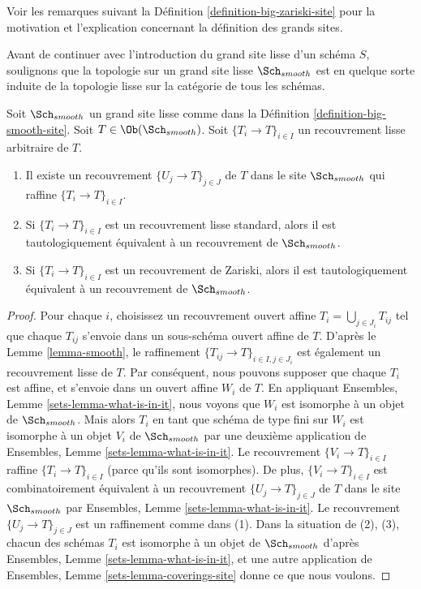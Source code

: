 \noindent
Voir les remarques suivant la Définition \ref{definition-big-zariski-site} pour la motivation et l'explication concernant la définition des grands sites.

\medskip\noindent
Avant de continuer avec l'introduction du grand site lisse d'un schéma $S$, soulignons que la topologie sur un grand site lisse $\Sch_{smooth}$ est en quelque sorte induite de la topologie lisse sur la catégorie de tous les schémas.

\begin{lemma}
\label{lemma-smooth-induced}
Soit $\Sch_{smooth}$ un grand site lisse comme dans la Définition \ref{definition-big-smooth-site}. Soit $T \in \Ob(\Sch_{smooth})$. Soit $\{T_i \to T\}_{i \in I}$ un recouvrement lisse arbitraire de $T$.
\begin{enumerate}
\item Il existe un recouvrement $\{U_j \to T\}_{j \in J}$ de $T$ dans le site $\Sch_{smooth}$ qui raffine $\{T_i \to T\}_{i \in I}$.
\item Si $\{T_i \to T\}_{i \in I}$ est un recouvrement lisse standard, alors il est tautologiquement équivalent à un recouvrement de $\Sch_{smooth}$.
\item Si $\{T_i \to T\}_{i \in I}$ est un recouvrement de Zariski, alors il est tautologiquement équivalent à un recouvrement de $\Sch_{smooth}$.
\end{enumerate}
\end{lemma}

\begin{proof}
Pour chaque $i$, choisissez un recouvrement ouvert affine $T_i = \bigcup_{j \in J_i} T_{ij}$ tel que chaque $T_{ij}$ s'envoie dans un sous-schéma ouvert affine de $T$. D'après le Lemme \ref{lemma-smooth}, le raffinement $\{T_{ij} \to T\}_{i \in I, j \in J_i}$ est également un recouvrement lisse de $T$. Par conséquent, nous pouvons supposer que chaque $T_i$ est affine, et s'envoie dans un ouvert affine $W_i$ de $T$. En appliquant Ensembles, Lemme \ref{sets-lemma-what-is-in-it}, nous voyons que $W_i$ est isomorphe à un objet de $\Sch_{smooth}$. Mais alors $T_i$ en tant que schéma de type fini sur $W_i$ est isomorphe à un objet $V_i$ de $\Sch_{smooth}$ par une deuxième application de Ensembles, Lemme \ref{sets-lemma-what-is-in-it}. Le recouvrement $\{V_i \to T\}_{i \in I}$ raffine $\{T_i \to T\}_{i \in I}$ (parce qu'ils sont isomorphes). De plus, $\{V_i \to T\}_{i \in I}$ est combinatoirement équivalent à un recouvrement $\{U_j \to T\}_{j \in J}$ de $T$ dans le site $\Sch_{smooth}$ par Ensembles, Lemme \ref{sets-lemma-what-is-in-it}. Le recouvrement $\{U_j \to T\}_{j \in J}$ est un raffinement comme dans (1). Dans la situation de (2), (3), chacun des schémas $T_i$ est isomorphe à un objet de $\Sch_{smooth}$ d'après Ensembles, Lemme \ref{sets-lemma-what-is-in-it}, et une autre application de Ensembles, Lemme \ref{sets-lemma-coverings-site} donne ce que nous voulons.
\end{proof}



